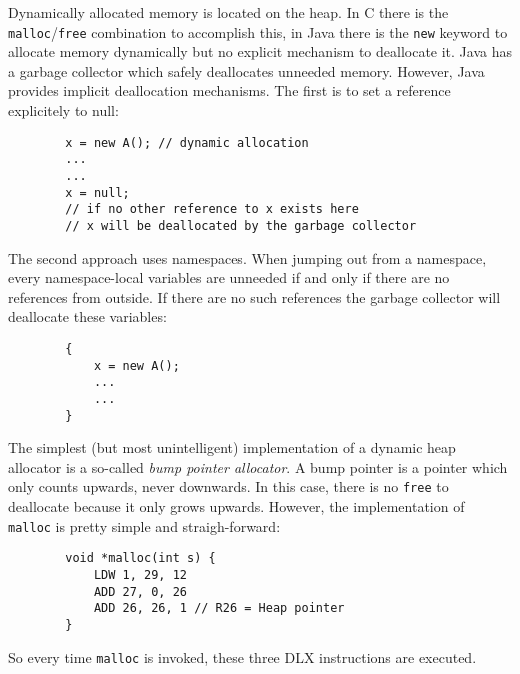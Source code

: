 \par{
	\noindent
	Dynamically allocated memory is located on the heap. In C there is the \texttt{malloc}/\texttt{free} combination to accomplish this, in Java there is the \texttt{new} keyword to allocate memory dynamically but no explicit mechanism to deallocate it. Java has a garbage collector which safely deallocates unneeded memory. However, Java provides implicit deallocation mechanisms. The first is to set a reference explicitely to null:
	\begin{verbatim}
        x = new A(); // dynamic allocation
        ...
        ...
        x = null;
        // if no other reference to x exists here
        // x will be deallocated by the garbage collector
	\end{verbatim}
	The second approach uses namespaces. When jumping out from a namespace, every namespace-local variables are unneeded if and only if there are no references from outside. If there are no such references the garbage collector will deallocate these variables:
	\begin{verbatim}
        {
            x = new A();
            ...
            ...
        }
	\end{verbatim}
}

\par{
    \noindent
    The simplest (but most unintelligent) implementation of a dynamic heap allocator is a so-called \textit{bump pointer allocator}. A bump pointer is a pointer which only counts upwards, never downwards. In this case, there is no \texttt{free} to deallocate because it only grows upwards. However, the implementation of \texttt{malloc} is pretty simple and straigh-forward:
    \begin{verbatim}
        void *malloc(int s) {
            LDW 1, 29, 12
            ADD 27, 0, 26
            ADD 26, 26, 1 // R26 = Heap pointer
        }
    \end{verbatim}
    So every time \texttt{malloc} is invoked, these three DLX instructions are executed.
}
